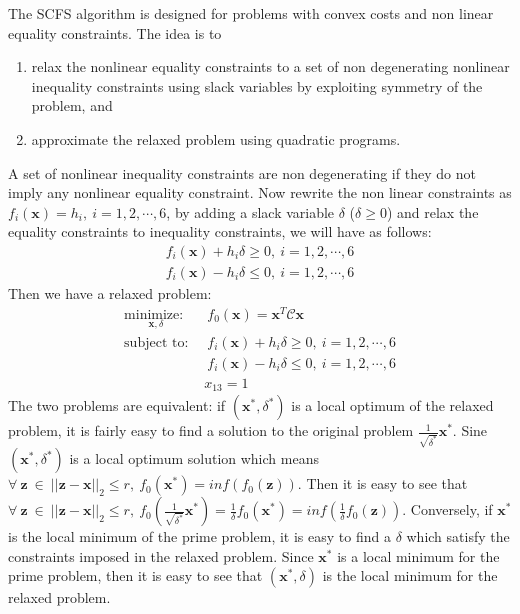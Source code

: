 The SCFS algorithm is designed for problems with convex costs and non linear equality constraints. The idea is to \begin{enumerate} \item relax the nonlinear equality constraints to a set of non degenerating nonlinear inequality constraints using slack variables by exploiting symmetry of the problem, and \item
approximate the relaxed problem using quadratic programs. \end{enumerate}   
A set of nonlinear inequality constraints are non degenerating
if they do not imply any nonlinear equality constraint.
Now rewrite the non linear constraints as $f_i(\mathbf{x})=h_i,\ i=1,2,\cdots,6$, by adding a slack variable $\delta$ ($\delta \geq 0$) and relax the equality constraints to inequality constraints, we will have as follows:
\begin{align}
f_i(\mathbf{x}) + h_i\delta \geq 0,\ i=1,2,\cdots,6 \nonumber \\
f_i(\mathbf{x}) - h_i\delta \leq 0,\ i=1,2,\cdots,6  
\label{eq:relax_cons}
\end{align}
Then we have a relaxed problem:
\begin{align}
\underset{\mathbf{x}, \delta}{\text{minimize: }}& \ f_0(\mathbf{x})=\mathbf{x}^T\mathcal{C}\mathbf{x}\\
\label{eq:non_con1}
\text{subject to: }& \ f_i(\mathbf{x}) + h_i\delta \geq 0,\ i=1,2,\cdots,6  \\
\label{eq:non_con2}
& \ f_i(\mathbf{x}) - h_i\delta \leq 0,\ i=1,2,\cdots,6 \nonumber \\ \nonumber 
& x_{13} = 1
\end{align}
The two problems are equivalent: if $(\mathbf{x}^{*}, \delta^{*})$ is a local optimum of the relaxed problem, it is fairly easy to find a solution to the original problem $\frac{1}{\sqrt{\delta^*}}\mathbf{x}^*$. Sine $(\mathbf{x}^*, \delta^*)$ is a local optimum solution which means $\forall\ \mathbf{z}\ \in\ ||\mathbf{z}-\mathbf{x}||_2 \leq r,\ f_0(\mathbf{x}^{*})=inf\left(f_0(\mathbf{z})\right)$. 
Then it is easy to see that $\forall\ \mathbf{z}\ \in\ ||\mathbf{z}-\mathbf{x}||_2 \leq r,\ f_0(\frac{1}{\sqrt{\delta^*}}\mathbf{x}^*)=\frac{1}{\delta}f_0(\mathbf{x}^*)=inf\left(\frac{1}{\delta}f_0(\mathbf{z})\right)$. Conversely, if $\mathbf{x}^*$ is the local minimum of the prime problem, it is easy to find a $\delta$ which satisfy the constraints imposed in the relaxed problem. Since $\mathbf{x}^*$ is a local minimum for the prime problem, then it is easy to see that $(\mathbf{x}^*, \delta)$ is the local minimum for the relaxed problem. \\
